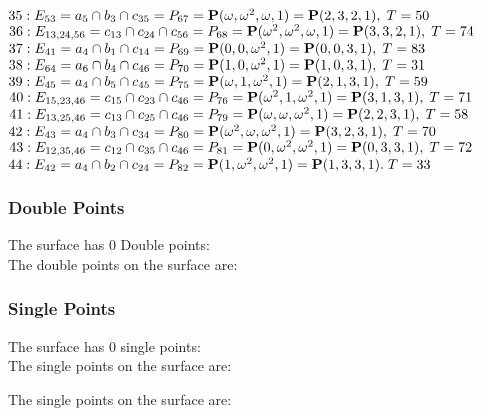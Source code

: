 \documentclass{article}
\newcommand{\bP}{{\bf P}}
\begin{document}
{$35 : E_{53}=a_{5} \cap b_{3} \cap c_{35} = P_{67}=\bP(\omega , \omega^{2}, \omega , 1) = \bP(2, 3, 2, 1),\; T= 50$\\
$36 : E_{13,24,56}=c_{13} \cap c_{24} \cap c_{56} = P_{68}=\bP(\omega^{2}, \omega^{2}, \omega , 1) = \bP(3, 3, 2, 1),\; T= 74$\\
$37 : E_{41}=a_{4} \cap b_{1} \cap c_{14} = P_{69}=\bP(0, 0, \omega^{2}, 1) = \bP(0, 0, 3, 1),\; T= 83$\\
$38 : E_{64}=a_{6} \cap b_{4} \cap c_{46} = P_{70}=\bP(1, 0, \omega^{2}, 1) = \bP(1, 0, 3, 1),\; T= 31$\\
$39 : E_{45}=a_{4} \cap b_{5} \cap c_{45} = P_{75}=\bP(\omega , 1, \omega^{2}, 1) = \bP(2, 1, 3, 1),\; T= 59$\\
$40 : E_{15,23,46}=c_{15} \cap c_{23} \cap c_{46} = P_{76}=\bP(\omega^{2}, 1, \omega^{2}, 1) = \bP(3, 1, 3, 1),\; T= 71$\\
$41 : E_{13,25,46}=c_{13} \cap c_{25} \cap c_{46} = P_{79}=\bP(\omega , \omega , \omega^{2}, 1) = \bP(2, 2, 3, 1),\; T= 58$\\
$42 : E_{43}=a_{4} \cap b_{3} \cap c_{34} = P_{80}=\bP(\omega^{2}, \omega , \omega^{2}, 1) = \bP(3, 2, 3, 1),\; T= 70$\\
$43 : E_{12,35,46}=c_{12} \cap c_{35} \cap c_{46} = P_{81}=\bP(0, \omega^{2}, \omega^{2}, 1) = \bP(0, 3, 3, 1),\; T= 72$\\
$44 : E_{42}=a_{4} \cap b_{2} \cap c_{24} = P_{82}=\bP(1, \omega^{2}, \omega^{2}, 1) = \bP(1, 3, 3, 1).\; T= 33$\\
\subsubsection*{Double Points}
The surface has 0 Double points:\\
The double points on the surface are:\\
\begin{multicols}{2}
\noindent
\end{multicols}
\subsubsection*{Single Points}
The surface has 0 single points:\\
The single points on the surface are:\\
\begin{multicols}{2}
\noindent
\end{multicols}
The single points on the surface are:\\
}
\end{document}
